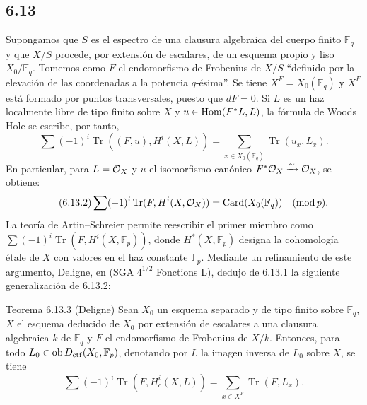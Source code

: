 \subsection*{6.13}
Supongamos que $S$ es el espectro de una clausura algebraica del cuerpo finito $\mathbb F_q$ y que $X/S$ procede, por extensión de escalares, de un esquema propio y liso $X_0/\mathbb F_q$. Tomemos como $F$ el endomorfismo de Frobenius de $X/S$ ``definido por la elevación de las coordenadas a la potencia $q$-\'esima''. Se tiene $X^F=X_0(\mathbb F_q)$ y $X^F$ está formado por puntos transversales, puesto que $dF=0$. Si $L$ es un haz localmente libre de tipo finito sobre $X$ y $u\in\operatorname{Hom}(F^*L,L)$, la fórmula de Woods Hole se escribe, por tanto,
\begin{equation}
\tag{6.13.1}
\sum(-1)^i\operatorname{Tr}((F,u),H^i(X,L))=
\sum_{x\in X_0(\mathbb F_q)}\operatorname{Tr}(u_x,L_x).
\end{equation}
En particular, para $L=\mathcal{O}_X$ y $u$ el isomorfismo canónico $F^*\mathcal{O}_X\xrightarrow{\sim}\mathcal{O}_X$, se obtiene:
\begin{equation}
\tag{6.13.2}
\sum(-1)^i\operatorname{Tr}(F,H^i(X,\mathcal{O}_X))=\operatorname{Card}(X_0(\mathbb F_q))\quad(\operatorname{mod} p).
\end{equation}
La teoría de Artin--Schreier permite reescribir el primer miembro como $\sum(-1)^i\operatorname{Tr}(F,H^i(X,\mathbb F_p))$, donde $H^*(X,\mathbb F_p)$ designa la cohomología étale de $X$ con valores en el haz constante $\mathbb F_p$. Mediante un refinamiento de este argumento, Deligne, en (SGA $4^{1/2}$ Fonctions L), dedujo de 6.13.1 la siguiente generalización de 6.13.2:


\begin{statement}{Teorema 6.13.3 (Deligne)}
Sean $X_0$ un esquema separado y de tipo finito sobre $\mathbb F_q$, $X$ el esquema deducido de $X_0$ por extensión de escalares a una clausura algebraica $k$ de $\mathbb F_q$ y $F$ el endomorfismo de Frobenius de $X/k$. Entonces, para todo $L_0\in\operatorname{ob} D_{\mathrm{ctf}}(X_0,\mathbb F_p)$, denotando por $L$ la imagen inversa de $L_0$ sobre $X$, se tiene
\[
\sum(-1)^i\operatorname{Tr}(F,H_c^i(X,L))=
\sum_{x\in X^F}\operatorname{Tr}(F,L_x).
\]
\end{statement}

